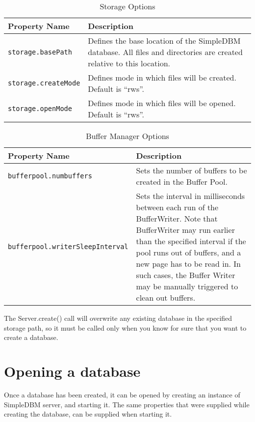 \documentclass[a4paper,draft,oneside]{book}
\begin{document}
\begin{table}[tbp]
\begin{center}
\begin{tabular}{|l|p{6cm}|}
  \hline
  \textbf{Property Name}&\textbf{Description}  \\
  \hline 
  \verb|storage.basePath|&Defines the base location of the
  SimpleDBM database. All files and directories are created relative to this
  location.  \\
  \hline 
  \verb|storage.createMode|&Defines mode in which files will be
  created. Default is ``rws''.  \\
  \hline 
  \verb|storage.openMode|&Defines mode in which files will be
  opened. Default is ``rws''.  \\
  \hline 
\end{tabular}
\end{center}
\caption{Storage Options}
\label{tab:storageoptions}
\end{table}

\begin{table}[tbp]
\begin{center}
\begin{tabular}{|l|p{5cm}|}
  \hline
  \textbf{Property Name}&\textbf{Description}  \\
  \hline 
  \verb|bufferpool.numbuffers|&Sets the number of buffers to be created in 
  the Buffer Pool.  \\
  \hline 
  \verb|bufferpool.writerSleepInterval|&Sets the interval in 
  milliseconds between each run of the BufferWriter. Note that BufferWriter 
  may run earlier than the specified interval if the pool runs out of 
  buffers, and a new page has to be read in. In such cases, the Buffer Writer
  may be manually triggered to clean out buffers.  \\
  \hline
\end{tabular}
\end{center}
\caption{Buffer Manager Options}
\label{tab:bufferoptions}
\end{table}

The Server.create() call will overwrite any existing database
in the specified storage path, so it must be called only when you know
for sure that you want to create a database.

\section{Opening a database}

Once a database has been created, it can be opened by creating an
instance of SimpleDBM server, and starting it. The same properties that were
supplied while creating the database, can be supplied when starting it.
\end{document}
